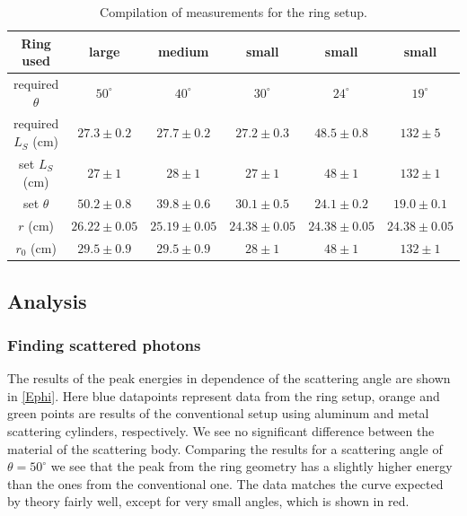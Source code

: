 \documentclass[a4paper,12pt]{article}
\begin{document}
\begin{table}[H]
	\renewcommand{\arraystretch}{1}
	\centering
	\Large
	\begin{adjustbox}{width=\textwidth}
		\begin{tabular}{c|ccccc}
			\hline
			Ring used & large & medium & small & small & small \\
			\hline
			required $\theta$ & $50^\circ$ & $40^\circ$ & $30^\circ$ & $24^\circ$ & $19^\circ$ \\
			\hline
			required $L_S$ (cm) & $27.3 \pm 0.2$ & $27.7 \pm 0.2$ & $27.2 \pm 0.3$ & $48.5 \pm 0.8$ & $132 \pm 5$ \\
			\hline
			set $L_S$ (cm) & $27 \pm 1$ & $28 \pm 1$ & $27 \pm 1$ & $48 \pm 1$ & $132 \pm 1$ \\
			\hline
			set $\theta$ & $50.2 \pm 0.8$ & $39.8 \pm 0.6$ & $30.1 \pm 0.5$ & $24.1 \pm 0.2$ & $19.0 \pm 0.1$ \\
			\hline
			$r$ (cm) & $26.22 \pm 0.05$ & $25.19 \pm 0.05$ & $24.38 \pm 0.05$ & $24.38 \pm 0.05$ & $24.38 \pm 0.05$ \\
			\hline
			$r_0$ (cm) & $29.5 \pm 0.9$ & $29.5 \pm 0.9$ & $28 \pm 1$ & $48 \pm 1$ & $132 \pm 1$ \\
			\hline
		\end{tabular}
	\end{adjustbox}
	\caption{Compilation of measurements for the ring setup. }
	\label{tab:ringsetup}
\end{table}
 

\subsection{Analysis}

\subsubsection{Finding scattered photons}

The results of the peak energies in dependence of the scattering angle are shown in \cref{Ephi}. Here blue datapoints represent data from the ring setup, orange and green points are results of the conventional setup using aluminum and metal scattering cylinders, respectively. We see no significant difference between the material of the scattering body. Comparing the results for a scattering angle of $\theta = 50 ^\circ$ we see that the peak from the ring geometry has a slightly higher energy than the ones from the conventional one. The data matches the curve expected by theory fairly well, except for very small angles, which is shown in red.
\end{document}

